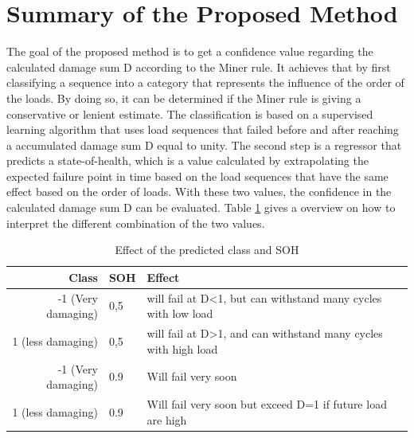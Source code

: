 \section{Summary of the Proposed Method}
The goal of the proposed method is to get a confidence value regarding the calculated damage sum D according to the Miner rule. It achieves that by first classifying a sequence into a category that represents the influence of the order of the loads. By doing so, it can be determined  if the Miner rule is giving a conservative or lenient estimate. The classification is based on a supervised learning algorithm that uses load sequences that failed before and after reaching a accumulated damage sum D equal to unity. The second step is a regressor that predicts a state-of-health, which is a value calculated by extrapolating the expected failure point in time based on the load sequences that have the same effect based on the order of loads. With these two values, the confidence in the calculated damage sum D can be evaluated.
Table \ref{cases} gives a overview on how to interpret the different combination of the two values. 

\begin{table}
	\begin{center}
		\begin{tabular}{|| r | l | l ||}
			\hline
			\rule{0pt}{2ex}Class & SOH & Effect\\
			\hline
			\hline
			\rule{0pt}{2ex}-1 (Very damaging)&  0,5 & will fail at D<1, but can withstand many cycles with low load\\\hline
			1 (less damaging)& 0,5 & will fail at D>1, and can withstand many cycles with high load\\\hline
			-1 (Very damaging)&  0.9 & Will fail very soon\\\hline
			1 (less damaging)& 0.9 & Will fail very soon but exceed D=1 if future load are high\\\hline
			\hline
		\end{tabular}
		\caption{Effect of the predicted class and SOH}
		\label{cases}
	\end{center}
	\vspace{-4mm}
\end{table}


